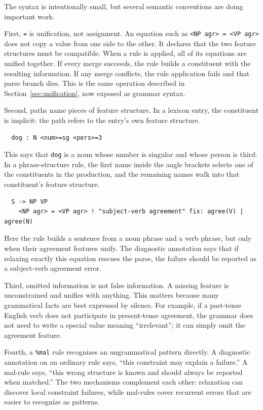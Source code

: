 \documentclass[11pt]{article}
\theoremstyle{definition}
\theoremstyle{plain}
\theoremstyle{remark}
\begin{document}
The syntax is intentionally small, but several semantic conventions are doing
important work.

First, \texttt{=} is unification, not assignment. An equation such as
\texttt{<NP agr> = <VP agr>} does not copy a value from one side to the other.
It declares that the two feature structures must be compatible. When a rule is
applied, all of its equations are unified together. If every merge succeeds, the
rule builds a constituent with the resulting information. If any merge conflicts,
the rule application fails and that parse branch dies. This is the same operation
described in Section~\ref{sec:unification}, now exposed as grammar syntax.

Second, paths name pieces of feature structure. In a lexicon entry, the
constituent is implicit: the path refers to the entry's own feature structure.

\begin{verbatim}
  dog : N <num>=sg <pers>=3
\end{verbatim}

This says that \texttt{dog} is a noun whose number is singular and whose person
is third. In a phrase-structure rule, the first name inside the angle brackets
selects one of the constituents in the production, and the remaining names walk
into that constituent's feature structure.

\begin{verbatim}
  S -> NP VP
    <NP agr> = <VP agr> ! "subject-verb agreement" fix: agree(V) | agree(N)
\end{verbatim}

Here the rule builds a sentence from a noun phrase and a verb phrase, but only
when their agreement features unify. The diagnostic annotation says that if
relaxing exactly this equation rescues the parse, the failure should be reported
as a subject-verb agreement error.

Third, omitted information is not false information. A missing feature is
unconstrained and unifies with anything. This matters because many grammatical
facts are best expressed by silence. For example, if a past-tense English verb
does not participate in present-tense agreement, the grammar does not need to
write a special value meaning ``irrelevant''; it can simply omit the agreement
feature.

Fourth, a \texttt{\%mal} rule recognizes an ungrammatical pattern directly. A
diagnostic annotation on an ordinary rule says, ``this constraint may explain a
failure.'' A mal-rule says, ``this wrong structure is known and should always be
reported when matched.'' The two mechanisms complement each other: relaxation
can discover local constraint failures, while mal-rules cover recurrent errors
that are easier to recognize as patterns.
\end{document}
